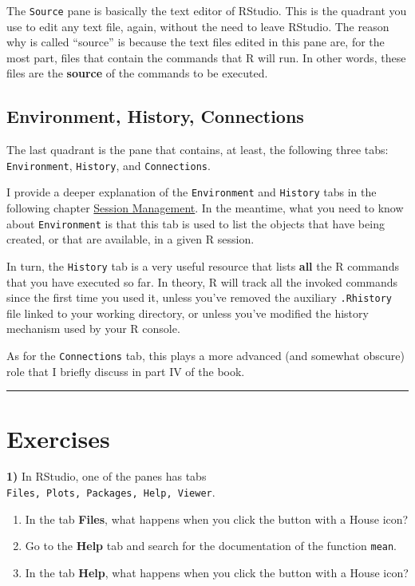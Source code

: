 \documentclass[
]{book}
\providecommand{\tightlist}{%
  \setlength{\itemsep}{0pt}\setlength{\parskip}{0pt}}
\begin{document}
The \texttt{Source} pane is basically the text editor of RStudio. This is the quadrant
you use to edit any text file, again, without the need to leave RStudio.
The reason why is called ``source'' is because the text files edited in this
pane are, for the most part, files that contain the commands that R will
run. In other words, these files are the \textbf{source} of the commands to be
executed.

\hypertarget{environment-history-connections}{%
\subsection{Environment, History, Connections}\label{environment-history-connections}}

The last quadrant is the pane that contains, at least, the following three
tabs: \texttt{Environment}, \texttt{History}, and \texttt{Connections}.

I provide a deeper explanation of the \texttt{Environment} and \texttt{History} tabs in the
following chapter \protect\hyperlink{session}{Session Management}. In the meantime, what you
need to know about \texttt{Environment} is that this tab is used to list the objects
that have being created, or that are available, in a given R session.

In turn, the \texttt{History} tab is a very useful resource that lists \textbf{all} the R
commands that you have executed so far. In theory, R will track all the invoked
commands since the first time you used it, unless you've removed the auxiliary
\texttt{.Rhistory} file linked to your working directory, or unless you've modified
the history mechanism used by your R console.

As for the \texttt{Connections} tab, this plays a more advanced (and somewhat obscure)
role that I briefly discuss in part IV of the book.

\begin{center}\rule{0.5\linewidth}{0.5pt}\end{center}

\hypertarget{exercises-1}{%
\section{Exercises}\label{exercises-1}}

\textbf{1)} In RStudio, one of the panes has tabs \texttt{Files,\ Plots,\ Packages,\ Help,\ Viewer}.

\begin{enumerate}
\def\labelenumi{\alph{enumi})}
\tightlist
\item
  In the tab \textbf{Files}, what happens when you click the button with a House icon?
\item
  Go to the \textbf{Help} tab and search for the documentation of the function \texttt{mean}.
\item
  In the tab \textbf{Help}, what happens when you click the button with a House icon?
\end{enumerate}
\end{document}
